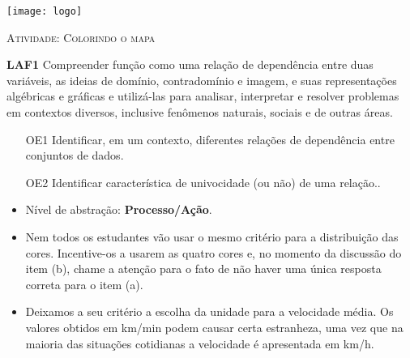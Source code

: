 \documentclass[10 pt,usenames,dvipsnames, oneside]{article}
\begin{document}
\begin{center}
  \begin{minipage}[l]{3cm}
\texttt{[image: logo]}    
\end{minipage}\hfill
\begin{minipage}[r]{.8\textwidth}
 {\Large \scshape Atividade: Colorindo o mapa}  
\end{minipage}
\end{center}
\vspace{.2cm}

\ifdefined\prof
\begin{objetivos}
\item \textbf{LAF1} Compreender função como uma relação de dependência entre duas variáveis, as ideias de domínio, contradomínio e imagem, e suas representações algébricas e gráficas e utilizá-las para analisar, interpretar e resolver problemas em contextos diversos, inclusive fenômenos naturais, sociais e de outras áreas.
\end{objetivos}

\begin{goals}
\begin{enumerate}

\item[OE1] Identificar, em um contexto, diferentes relações de dependência entre conjuntos de dados.

\item[OE2] Identificar característica de univocidade (ou não) de uma relação..

\end{enumerate}

\tcblower

\begin{itemize}
\item Nível de abstração: \textbf{Processo/Ação}.

\item Nem todos os estudantes vão usar o mesmo critério para a distribuição das cores. Incentive-os a usarem as quatro cores e, no momento da discussão do item (b), chame a atenção para o fato de não haver uma única resposta correta para o item (a).

\item Deixamos a seu critério a escolha da unidade para a velocidade média. Os valores obtidos em km/min podem causar certa estranheza, uma vez que na maioria das situações cotidianas a velocidade é apresentada em km/h.

\end{itemize}

\end{goals}
\end{document}
